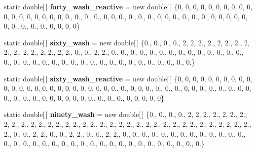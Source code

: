 \begin{DoxyCompactItemize}
\item 
\hypertarget{classuk_1_1ac_1_1dmu_1_1iesd_1_1cascade_1_1util_1_1_initial_profile_gen_utils_ab21da44529cc6226200bae7bbf5dc2e8}{static double\mbox{[}$\,$\mbox{]} {\bfseries forty\-\_\-wash\-\_\-reactive} = new double\mbox{[}$\,$\mbox{]} \{0, 0, 0, 0, 0, 0, 0, 0, 0, 0, 0, 0, 0, 0, 0, 0, 0, 0, 0., 0., 0., 0., 0, 0, 0., 0., 0., 0., 0, 0, 0., 0., 0., 0., 0, 0, 0, 0, 0, 0, 0., 0., 0., 0., 0, 0, 0, 0\}}\label{classuk_1_1ac_1_1dmu_1_1iesd_1_1cascade_1_1util_1_1_initial_profile_gen_utils_ab21da44529cc6226200bae7bbf5dc2e8}

\item 
\hypertarget{classuk_1_1ac_1_1dmu_1_1iesd_1_1cascade_1_1util_1_1_initial_profile_gen_utils_a76eac998f315447ad80077de1cc43be9}{static double\mbox{[}$\,$\mbox{]} {\bfseries sixty\-\_\-wash} = new double\mbox{[}$\,$\mbox{]} \{0., 0., 0., 0., 2, 2, 2., 2., 2, 2., 2., 2, 2., 2., 2, 2., 2, 2., 2, 2., 0., 0., 2, 2., 0., 0., 0., 0., 0., 0., 0., 0., 0., 0., 0., 0., 0., 0., 0., 0., 0., 0., 0., 0., 0., 0., 0., 0., 0., 0., 0., 0., 0., 0., 0., 0., 0., 0.\}}\label{classuk_1_1ac_1_1dmu_1_1iesd_1_1cascade_1_1util_1_1_initial_profile_gen_utils_a76eac998f315447ad80077de1cc43be9}

\item 
\hypertarget{classuk_1_1ac_1_1dmu_1_1iesd_1_1cascade_1_1util_1_1_initial_profile_gen_utils_a2c8b3d381aa5dd7b88f89fa1a60621bd}{static double\mbox{[}$\,$\mbox{]} {\bfseries sixty\-\_\-wash\-\_\-reactive} = new double\mbox{[}$\,$\mbox{]} \{0, 0, 0, 0, 0, 0, 0, 0, 0, 0, 0, 0, 0, 0, 0, 0, 0, 0, 0, 0, 0, 0, 0, 0, 0., 0., 0, 0, 0., 0., 0., 0., 0, 0, 0., 0., 0., 0., 0, 0, 0., 0., 0., 0., 0, 0, 0, 0, 0, 0, 0., 0., 0., 0., 0, 0, 0, 0, 0\}}\label{classuk_1_1ac_1_1dmu_1_1iesd_1_1cascade_1_1util_1_1_initial_profile_gen_utils_a2c8b3d381aa5dd7b88f89fa1a60621bd}

\item 
\hypertarget{classuk_1_1ac_1_1dmu_1_1iesd_1_1cascade_1_1util_1_1_initial_profile_gen_utils_ada24a78d6a1d9ce17cfcce229f7fab64}{static double\mbox{[}$\,$\mbox{]} {\bfseries ninety\-\_\-wash} = new double\mbox{[}$\,$\mbox{]} \{0., 0., 0., 0., 2, 2, 2., 2., 2, 2., 2., 2, 2., 2., 2, 2., 2, 2., 2, 2., 2, 2., 2., 2., 2, 2., 2., 2, 2., 2., 2., 2, 2., 2., 2., 2, 2, 2., 2., 2., 0., 0., 2, 2., 0., 0., 2, 2., 0., 0., 2, 2., 0., 0., 0., 0., 0., 0., 0., 0., 0., 0., 0., 0., 0., 0., 0., 0., 0., 0., 0., 0., 0., 0., 0., 0., 0., 0., 0., 0., 0., 0., 0., 0., 0., 0.\}}\label{classuk_1_1ac_1_1dmu_1_1iesd_1_1cascade_1_1util_1_1_initial_profile_gen_utils_ada24a78d6a1d9ce17cfcce229f7fab64}


\end{DoxyCompactItemize}
